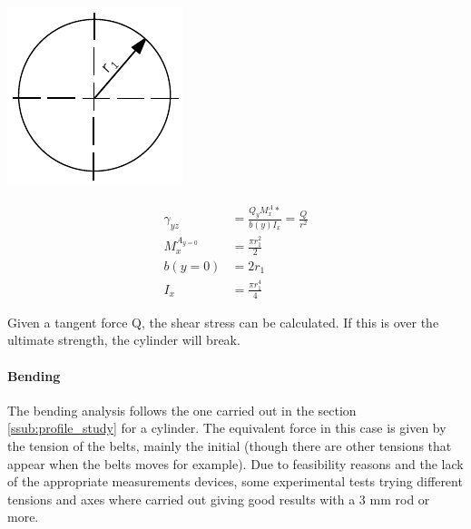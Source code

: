   \noindent\begin{minipage}{0.2\textwidth}%
  \includegraphics[width=\linewidth]{figures/profile_tube.pdf}
  \end{minipage}%
  \hfill%
  \begin{minipage}{0.8\textwidth}
    \begin{equation}
    \begin{aligned}
      \gamma_{yz} &= \frac{Q_y M_{x}^A*}{b(y) I_x} = \frac{Q}{r^2}\\
      M_{x}^{A_{y=0}} &= \frac{\pi r_1^2}{2} \\
      b(y=0) &= 2 r_1 \\
      I_x &= \frac{\pi r_1^4}{4}
      \end{aligned}
    \end{equation}
  \end{minipage}
  Given a tangent force Q, the shear stress can be calculated.
  If this is over the ultimate strength, the cylinder will break.

  \paragraph{Bending} %
  \label{ssub:bending}
  The bending analysis follows the one carried out in the section \ref{ssub:profile_study} for a cylinder.
  The equivalent force in this case is given by the tension of the belts, mainly the initial (though there are other tensions that appear when the belts moves for example).
  Due to feasibility reasons and the lack of the appropriate measurements devices, some experimental tests trying different tensions and axes where carried out giving good results with a 3 mm rod or more.

